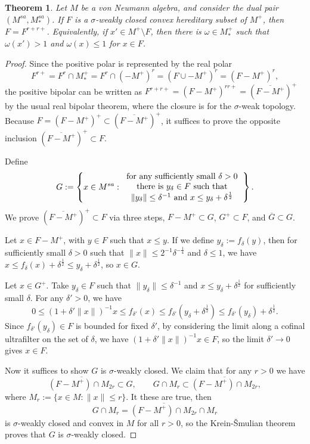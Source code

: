 \documentclass[noamsfonts,a4paper,10pt]{amsart}
\theoremstyle{plain}
\newtheorem{theorem}{Theorem}[section]
\theoremstyle{definition}
\begin{document}
\begin{theorem}\label{1}
Let $M$ be a von Neumann algebra, and consider the dual pair $(M^{sa},M_*^{sa})$.
If $F$ is a $\sigma$-weakly closed convex hereditary subset of $M^+$, then $F=F^{r+r+}$.
Equivalently, if $x'\in M^+\setminus F$, then there is $\omega\in M_*^+$ such that $\omega(x')>1$ and $\omega(x)\le1$ for $x\in F$.
\end{theorem}
\begin{proof}
Since the positive polar is represented by the real polar
\[F^{r+}=F^r\cap M_*^+=F^r\cap(-M^+)^r=(F\cup-M^+)^r=(F-M^+)^r,\]
the positive bipolar can be written as $F^{r+r+}=(F-M^+)^{rr+}=(\overline{F-M^+})^+$ by the usual real bipolar theorem, where the closure is for the $\sigma$-weak topology.
Because $F=(F-M^+)^+\subset(\overline{F-M^+})^+$, it suffices to prove the opposite inclusion $(\overline{F-M^+})^+\subset F$.

Define
\[G:=\left\{x\in M^{sa}:\begin{tabular}{c}
for any sufficiently small $\delta>0$\\
there is $y_\delta\in F$ such that\\
$\|y_\delta\|\le\delta^{-1}$ and $x\le y_\delta+\delta^{\frac12}$\\
\end{tabular}\right\}.\]
We prove $(\overline{F-M^+})^+\subset F$ via three steps, $F-M^+\subset G$, $G^+\subset F$, and $\overline G\subset G$.

Let $x\in F-M^+$, with $y\in F$ such that $x\le y$.
If we define $y_\delta:=f_\delta(y)$, then for sufficiently small $\delta>0$ such that $\|x\|\le2^{-1}\delta^{-\frac14}$ and $\delta\le1$, we have $x\le f_\delta(x)+\delta^{\frac12}\le y_\delta+\delta^{\frac12}$, so $x\in G$.

Let $x\in G^+$.
Take $y_\delta\in F$ such that $\|y_\delta\|\le\delta^{-1}$ and $x\le y_\delta+\delta^{\frac12}$ for sufficiently small $\delta$.
For any $\delta'>0$, we have
\[0\le(1+\delta'\|x\|)^{-1}x\le f_{\delta'}(x)\le f_{\delta'}(y_\delta+\delta^{\frac12})\le f_{\delta'}(y_\delta)+\delta^{\frac12}.\]
Since $f_{\delta'}(y_\delta)\in F$ is bounded for fixed $\delta'$, by considering the limit along a cofinal ultrafilter on the set of $\delta$, we have $(1+\delta'\|x\|)^{-1}x\in F$, so the limit $\delta'\to0$ gives $x\in F$.

Now it suffices to show $G$ is $\sigma$-weakly closed.
We claim that for any $r>0$ we have
\[\overline{(F-M^+)\cap M_{2r}}\subset G,\qquad G\cap M_r\subset\overline{(F-M^+)\cap M_{2r}},\]
where $M_r:=\{x\in M:\|x\|\le r\}$.
It these are true, then
\[G\cap M_r=\overline{(F-M^+)\cap M_{2r}}\cap M_r\]
is $\sigma$-weakly closed and convex in $M$ for all $r>0$, so the Krein-\v Smulian theorem proves that $G$ is $\sigma$-weakly closed.


\end{proof}
\end{document}
